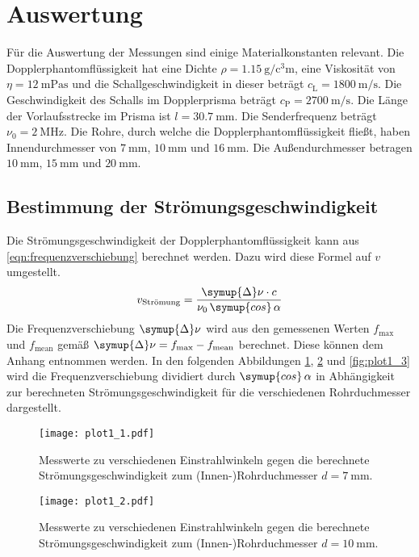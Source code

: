 \section{Auswertung}
\label{sec:Auswertung}
Für die Auswertung der Messungen sind einige Materialkonstanten relevant. Die Dopplerphantomflüssigkeit hat eine Dichte $\rho = \qty{1.15}{\gram\per\cubic\centi\metre}$,
eine Viskosität von $\eta = \qty{12}{\milli\pascal\second}$ und
die Schallgeschwindigkeit in dieser beträgt $c_\text{L} = \qty{1800}{\metre\per\second}$. Die Geschwindigkeit des Schalls im Dopplerprisma
beträgt $c_\text{P} = \qty{2700}{\metre\per\second}$. Die Länge der Vorlaufsstrecke im Prisma ist $l = \qty{30.7}{\milli\metre}$. Die Senderfrequenz beträgt 
$\nu_0 = \qty{2}{\mega\hertz}$. Die Rohre, durch welche die Dopplerphantomflüssigkeit fließt, haben Innendurchmesser von $\qty{7}{\milli\metre}$, $\qty{10}{\milli\metre}$
und $\qty{16}{\milli\metre}$. Die Außendurchmesser betragen $\qty{10}{\milli\metre}$, $\qty{15}{\milli\metre}$ und $\qty{20}{\milli\metre}$.

\subsection{Bestimmung der Strömungsgeschwindigkeit}
Die Strömungsgeschwindigkeit der Dopplerphantomflüssigkeit kann aus \autoref{eqn:frequenzverschiebung} berechnet werden. Dazu wird diese Formel auf $v$ umgestellt.
\begin{equation*}
  v_\text{Strömung} = \frac{\symup{\Delta}\nu\cdot c}{\nu_0\,\symup{cos}\,\alpha} 
\end{equation*}
Die Frequenzverschiebung $\symup{\Delta}\nu$ wird aus den gemessenen Werten $f_\text{max}$ und $f_\text{mean}$ gemäß $\symup{\Delta}\nu = f_\text{max} - f_\text{mean}$ berechnet.
Diese können dem Anhang entnommen werden.
In den folgenden Abbildungen \ref{fig:plot1_1}, \ref{fig:plot1_2} und \ref{fig:plot1_3} wird die Frequenzverschiebung dividiert durch $\symup{cos}\,\alpha$ in 
Abhängigkeit zur berechneten Strömungsgeschwindigkeit für die verschiedenen Rohrduchmesser dargestellt.
\begin{figure}
  \centering
  \texttt{[image: plot1\_1.pdf]}
  \caption{Messwerte zu verschiedenen Einstrahlwinkeln gegen die berechnete Strömungsgeschwindigkeit zum (Innen-)Rohrduchmesser $d = \qty{7}{\milli\metre}$.}
  \label{fig:plot1_1}
\end{figure}

\begin{figure}
  \centering
  \texttt{[image: plot1\_2.pdf]}
  \caption{Messwerte zu verschiedenen Einstrahlwinkeln gegen die berechnete Strömungsgeschwindigkeit zum (Innen-)Rohrduchmesser $d = \qty{10}{\milli\metre}$.}
  \label{fig:plot1_2}
\end{figure}

